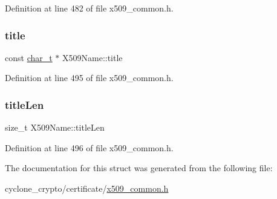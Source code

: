 Definition at line 482 of file x509\+\_\+common.\+h.

\mbox{\label{structX509Name_a5d2ae5a4848f91eccefbeabc69820652}} 
\subsubsection{\texorpdfstring{title}{title}}
{\footnotesize\ttfamily const \hyperlink{compiler__port_8h_a40bb5262bf908c328fbcfbe5d29d0201}{char\+\_\+t} $\ast$ X509\+Name\+::title}



Definition at line 495 of file x509\+\_\+common.\+h.

\mbox{\label{structX509Name_a0058184d7e0354caeac1e7fdad588b83}} 
\subsubsection{\texorpdfstring{title\+Len}{titleLen}}
{\footnotesize\ttfamily size\+\_\+t X509\+Name\+::title\+Len}



Definition at line 496 of file x509\+\_\+common.\+h.



The documentation for this struct was generated from the following file\+:\begin{DoxyCompactItemize}
\item 
cyclone\+\_\+crypto/certificate/\hyperlink{certificate_2x509__common_8h}{x509\+\_\+common.\+h}\end{DoxyCompactItemize}
